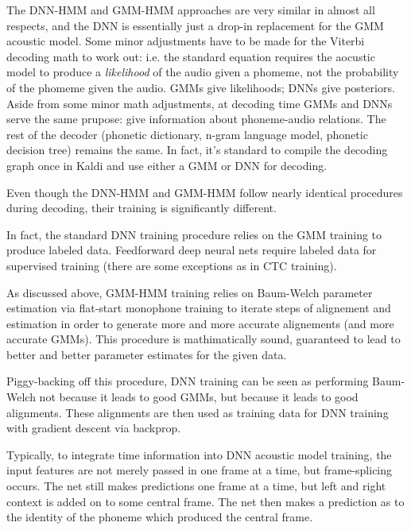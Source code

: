 \documentclass[10pt,a4paper]{article}
\begin{document}
The DNN-HMM and GMM-HMM approaches are very similar in almost all respects, and the DNN is essentially just a drop-in replacement for the GMM acoustic model. Some minor adjustments have to be made for the Viterbi decoding math to work out: i.e. the standard equation requires the aocustic model to produce a \textit{likelihood} of the audio given a phomeme, not the  probability of the phomeme given the audio. GMMs give likelihoods; DNNs give posteriors. Aside from some minor math adjustments, at decoding time GMMs and DNNs serve the same prupose: give information about phoneme-audio relations. The rest of the decoder (phonetic dictionary, n-gram language model, phonetic decision tree) remains the same. In fact, it's standard to compile the decoding graph once in Kaldi and use either a GMM or DNN for decoding.

Even though the DNN-HMM and GMM-HMM follow nearly identical procedures during decoding, their training is significantly different.

In fact, the standard DNN training procedure relies on the GMM training to produce labeled data. Feedforward deep neural nets require labeled data for supervised training (there are some exceptions as in CTC training).

As discussed above, GMM-HMM training relies on Baum-Welch parameter estimation via flat-start monophone training to iterate steps of alignement and estimation in order to generate more and more accurate alignements (and more accurate GMMs). This procedure is mathimatically sound, guaranteed to lead to better and better parameter estimates for the given data.

Piggy-backing off this procedure, DNN training can be seen as performing Baum-Welch not because it leads to good GMMs, but because it leads to good alignments. These alignments are then used as training data for DNN training with gradient descent via backprop.

Typically, to integrate time information into DNN acoustic model training, the input features are not merely passed in one frame at a time, but frame-splicing occurs. The net still makes predictions one frame at a time, but left and right context is added on to some central frame. The net then makes a prediction as to the identity of the phoneme which produced the central frame.
\end{document}
